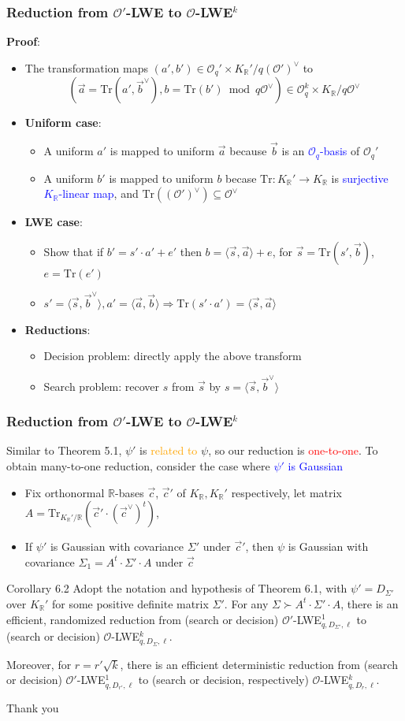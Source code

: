 \documentclass{beamer}
\newcommand{\blue}[1]{\textcolor{blue}{#1}}
\newcommand{\dgreen}[1]{\textcolor{dgreen}{#1}}
\newcommand{\orange}[1]{\textcolor{orange}{#1}}
\newcommand{\red}[1]{\textcolor{red}{#1}}
\newcommand{\cO}{\mathcal{O}}
\newcommand{\bbR}{\mathbb{R}}
\newcommand{\Tr}{\mathrm{Tr}}
\newcommand{\TrKRpR}{\mathrm{Tr}_{K_{\mathbb{R}}'/\mathbb{R}}}
\newcommand{\cOV}{\mathcal{O}^{\vee}}
\newcommand{\cOpV}{(\mathcal{O'})^{\vee}}
\newcommand{\KR}{K_{\mathbb{R}}}
\newcommand{\va}{\vec{a}}
\newcommand{\vb}{\vec{b}}
\newcommand{\vc}{\vec{c}}
\newcommand{\vs}{\vec{s}}
\newcommand{\vbV}{\vec{b}^{\vee}}
\newcommand{\vcV}{\vec{c}^{\vee}}
\begin{document}
\frame
{
  \frametitle{Reduction from $\cO'$-LWE to $\cO$-LWE$^k$}
  \textbf{Proof}:
  \begin{itemize}
  	\item The transformation maps $(a',b')\in\cO_q'\times\KR'/q\cOpV$ to
  		\[(\va=\Tr(a',\vbV), b=\Tr(b')\bmod q\cOV)\in\cO_q^k\times\KR/q\cOV\]
  	\item \textbf{Uniform case}:
  		\begin{itemize}
  			\item A \dgreen{uniform} $a'$ is mapped to \dgreen{uniform} $\va$ because $\vb$ is an \blue{$\cO_q$-basis} of $\cO_q'$
  			\item A \dgreen{uniform} $b'$ is mapped to \dgreen{uniform} $b$ becase $\Tr:\KR'\to\KR$ is \blue{surjective $\KR$-linear map}, and $\Tr(\cOpV)\subseteq\cOV$
  		\end{itemize}
  	\item \textbf{LWE case}:
  		\begin{itemize}
  			\item Show that if $b'=s'\cdot a'+e'$ then $b=\langle\vs,\va\rangle+e$, for $\vs=\Tr(s',\vb)$, $e=\Tr(e')$
  			\item $s'=\langle\vs,\vbV\rangle, a'=\langle\va,\vb\rangle\Rightarrow\Tr(s'\cdot a')=\langle\vs,\va\rangle$
  		\end{itemize}
  	\item \textbf{Reductions}:
  		\begin{itemize}
  			\item Decision problem: directly apply the above transform
  			\item Search problem: recover $s$ from $\vs$ by $s=\langle\vs,\vbV\rangle$
  		\end{itemize}
  \end{itemize}
}

\frame
{
  \frametitle{Reduction from $\cO'$-LWE to $\cO$-LWE$^k$}
  Similar to Theorem 5.1, $\psi'$ is \orange{related to} $\psi$, so our reduction is \red{one-to-one}. To obtain \dgreen{many-to-one} reduction, consider the case where \blue{$\psi'$ is Gaussian}
  \begin{itemize}
  	\item Fix orthonormal $\bbR$-bases $\vc$, $\vc'$ of $\KR,\KR'$ respectively, let matrix $A=\TrKRpR(\vc'\cdot(\vcV)^t)$,
  	\item If $\psi'$ is Gaussian with covariance $\Sigma'$ under $\vc'$, then $\psi$ is Gaussian with covariance $\Sigma_1=A^t\cdot\Sigma'\cdot A$ under $\vc$
  \end{itemize}
  \begin{block}{Corollary 6.2}
  Adopt the notation and hypothesis of Theorem 6.1, with $\psi'=D_{\Sigma'}$ over $\KR'$ for some positive definite matrix $\Sigma'$. For any $\Sigma\succ A^t\cdot\Sigma'\cdot A$, there is an \dgreen{efficient, randomized} reduction from (search or decision) $\cO'$-LWE$_{q,D_{\Sigma'},\ell}^1$ to (search or decision) $\cO$-LWE$_{q,D_{\Sigma},\ell}^k$.

  Moreover, for $r=r'\sqrt{k}$, there is an \dgreen{efficient deterministic reduction} from (search or decision) $\cO'$-LWE$_{q,D_{r'},\ell}^1$ to (search or decision, respectively) $\cO$-LWE$_{q,D_{r},\ell}^k$.
  \end{block}
}

\frame
{
	\Huge\center Thank you
}
\end{document}
